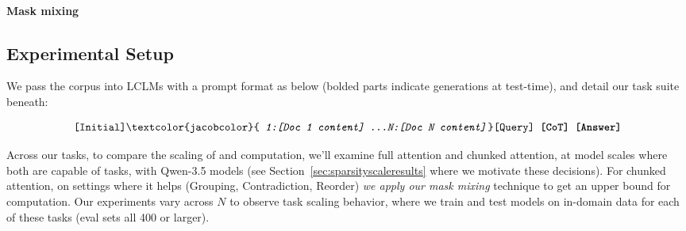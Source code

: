 \paragraph{Mask mixing} 

\subsection{Experimental Setup}

We pass the corpus into LCLMs with a prompt format as below (bolded parts indicate generations at test-time), and detail our task suite beneath:


{\small$${\texttt{[Initial]\textcolor{jacobcolor}{\textit{ 1:[Doc 1 content] \ldots N:[Doc N content]}} [Query] \textbf{[CoT] [Answer]}}}$$}


Across our tasks, to compare the scaling of  and  computation, we'll examine full attention and chunked attention, at model scales where both are capable of tasks, with Qwen-3.5 \citep{qwen3.5} models (see Section~\ref{sec:sparsityscaleresults} where we motivate these decisions). For chunked attention, on settings where it helps (Grouping, Contradiction, Reorder) \emph{we apply our mask mixing} technique to get an upper bound for  computation. Our experiments vary across $N$ to observe task scaling behavior, where we train and test models on in-domain data for each of these tasks (eval sets all 400 or larger). 
